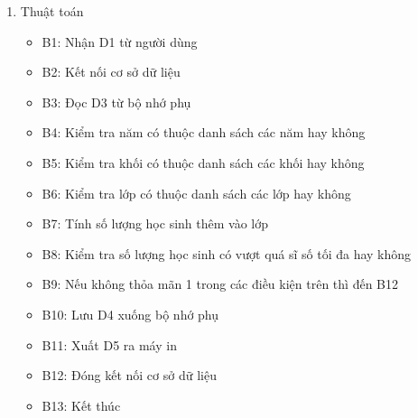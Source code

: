 \documentclass[a4paper]{article}
\begin{document}
\begin{enumerate}[label=\alph*.]
\begin{itemize}
\end{itemize}


\item Thuật toán
\begin{itemize}
\item B1: Nhận D1 từ người dùng
\item B2: Kết nối cơ sở dữ liệu
\item B3: Đọc D3 từ bộ nhớ phụ
\item B4: Kiểm tra năm có thuộc danh sách các năm hay không
\item B5: Kiểm tra khối có thuộc danh sách các khối hay không
\item B6: Kiểm tra lớp có thuộc danh sách các lớp hay không
\item B7: Tính số lượng học sinh thêm vào lớp
\item B8: Kiểm tra số lượng học sinh có vượt quá sĩ số tối đa hay không
\item B9: Nếu không thỏa mãn 1 trong các điều kiện trên thì đến B12
\item B10: Lưu D4 xuống bộ nhớ phụ
\item B11: Xuất D5 ra máy in
\item B12: Đóng kết nối cơ sở dữ liệu
\item B13: Kết thúc

\end{itemize}


\end{enumerate}	
	
	
\end{document}
